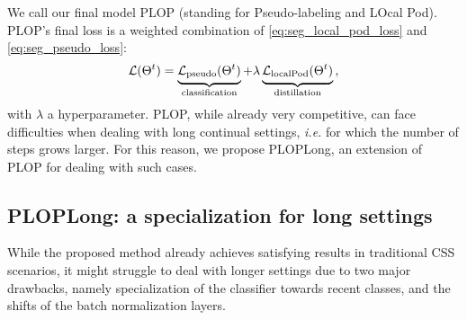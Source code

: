 We call our final model PLOP (standing for Pseudo-labeling and LOcal Pod). PLOP's final loss is a
weighted combination of \autoref{eq:seg_local_pod_loss} and \autoref{eq:seg_pseudo_loss}:
%
\begin{equation}
    \mathcal{L}(\Theta^t) = \underbrace{\strut \mathcal{L}_\text{pseudo}(\Theta^t)}_\text{classification} + \lambda\underbrace{\strut \mathcal{L}_\text{localPod}(\Theta^t)}_\text{distillation}\,,
    \label{eq:seg_complete_loss}
\end{equation}
%
with $\lambda$ a hyperparameter. PLOP, while already very competitive, can face difficulties when
dealing with long continual settings, \textit{i.e.} for which the number of steps grows larger. For
this reason, we propose PLOPLong, an extension of PLOP for dealing with such cases.

\subsection{PLOPLong: a specialization for long settings}\label{sec:seg_plopv2}

While the proposed method already achieves satisfying results in traditional \ac{CSS} scenarios, it might
struggle to deal with longer settings due to two major drawbacks, namely specialization of the
classifier towards recent classes, and the shifts of the batch normalization layers.

